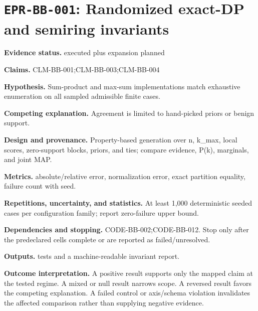 \section[\texttt{EPR-BB-001}]{\texttt{EPR-BB-001}: Randomized exact-DP and semiring invariants}
\textbf{Evidence status.} executed plus expansion planned\par
\textbf{Claims.} CLM-BB-001;CLM-BB-003;CLM-BB-004\par
\textbf{Hypothesis.} Sum-product and max-sum implementations match exhaustive enumeration on all sampled admissible finite cases.\par
\textbf{Competing explanation.} Agreement is limited to hand-picked priors or benign support.\par
\textbf{Design and provenance.} Property-based generation over n, k\_max, local scores, zero-support blocks, priors, and ties; compare evidence, P(k), marginals, and joint MAP.\par
\textbf{Metrics.} absolute/relative error, normalization error, exact partition equality, failure count with seed.\par
\textbf{Repetitions, uncertainty, and statistics.} At least 1,000 deterministic seeded cases per configuration family; report zero-failure upper bound.\par
\textbf{Dependencies and stopping.} CODE-BB-002;CODE-BB-012. Stop only after the predeclared cells complete or are reported as failed/unresolved.\par
\textbf{Outputs.} tests and a machine-readable invariant report.\par
\textbf{Outcome interpretation.} A positive result supports only the mapped claim at the tested regime. A mixed or null result narrows scope. A reversed result favors the competing explanation. A failed control or axis/schema violation invalidates the affected comparison rather than supplying negative evidence.

